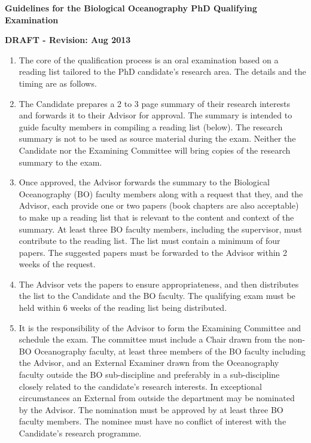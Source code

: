 \textbf{Guidelines for the Biological Oceanography PhD Qualifying Examination}

\textbf{DRAFT - Revision: Aug 2013}

\begin{enumerate}
\item The core of the qualification process is an oral examination based on a reading list tailored to the PhD candidate’s research area. The details and the timing are as follows.

\item The Candidate prepares a 2 to 3 page summary of their research interests and forwards it to their Advisor for approval. The summary is intended to guide faculty members in compiling a reading list (below). The research summary is not to be used as source material during the exam. Neither the Candidate nor the Examining Committee will bring copies of the research summary to the exam.

\item Once approved, the Advisor forwards the summary to the Biological Oceanography (BO) faculty members along with a request that they, and the Advisor, each provide one or two papers (book chapters are also acceptable) to make up a reading list that is relevant to the content and context of the summary. At least three BO faculty members, including the supervisor, must contribute to the reading list. The list must contain a minimum of four papers. The suggested papers must be forwarded to the Advisor within 2 weeks of the request. 

\item The Advisor vets the papers to ensure appropriateness, and then distributes the list to the Candidate and the BO faculty. The qualifying exam must be held within 6 weeks of the reading list being distributed. 

\item It is the responsibility of the Advisor to form the Examining Committee and schedule the exam. The committee must include a Chair drawn from the non-BO Oceanography faculty, at least three members of the BO faculty including the Advisor, and an External Examiner drawn from the Oceanography faculty outside the BO sub-discipline and preferably in a sub-discipline closely related to the candidate’s research interests. In exceptional circumstances an External from outside the department may be nominated by the Advisor. The nomination must be approved by at least three BO faculty members. The nominee must have no conflict of interest with the Candidate’s research programme. 


\end{enumerate}
